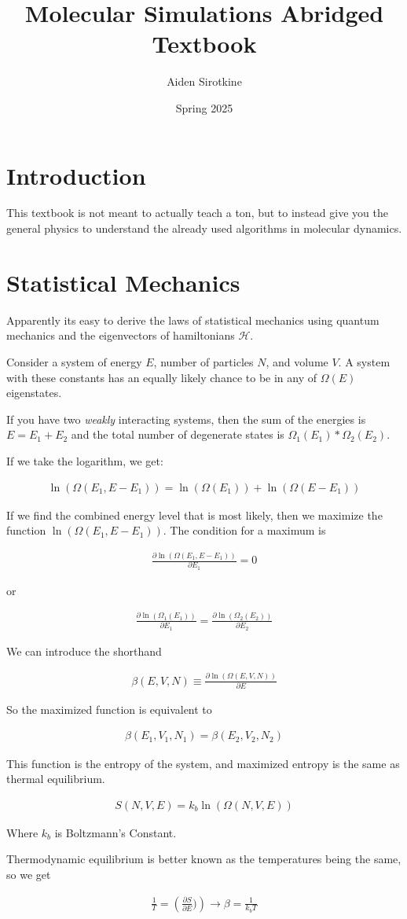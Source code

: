\documentclass[fleqn]{report}
\date{Spring 2025}
\title{Molecular Simulations Abridged Textbook}
\author{Aiden Sirotkine}
\newcommand{\del}{\partial}
\newcommand{\equations} [1] {
\begin{gather*}
#1
\end{gather*}
}
\begin{document}
\pagestyle{fancy}
\maketitle
\tableofcontents
\clearpage

\chapter{Introduction}
This textbook is not meant to actually teach a ton, but to instead 
give you the general physics to understand the already used algorithms 
in molecular dynamics. 


\chapter{Statistical Mechanics}
Apparently its easy to derive the laws of statistical mechanics using 
quantum mechanics and the eigenvectors of hamiltonians $\mathcal H$.

Consider a system of energy $E$, number of particles $N$, and volume $V$. 
A system with these constants has an equally likely chance to be in any 
of $\Omega(E)$ eigenstates. 

If you have two \textit{weakly} interacting systems, then the sum of the energies 
is $E = E_1 + E_2$ and the total number of degenerate states is 
$\Omega_1(E_1) * \Omega_2(E_2)$.

If we take the logarithm, we get:
\equations{
    \ln(\Omega(E_1, E - E_1)) 
    =
    \ln(\Omega(E_1))
    +
    \ln(\Omega(E - E_1))
}

If we find the combined energy level that is most likely, then we maximize 
the function $\ln(\Omega(E_1, E - E_1))$. The condition for a maximum is 
\equations{
    \frac{\del \ln(\Omega(E_1, E - E_1)) }{\del E_1}
    =
    0
}
or 
\equations{
    \frac{\del \ln(\Omega_1(E_1)) }{\del E_1}
    =
    \frac{\del \ln(\Omega_2(E_2)) }{\del E_2}
}
We can introduce the shorthand 
\equations{
    \beta(E, V, N)
    \equiv
    \frac{\del \ln(\Omega(E, V, N)) }{\del E}
}
So the maximized function is equivalent to 
\equations{
    \beta(E_1, V_1, N_1)
    =
    \beta(E_2, V_2, N_2)
}
This function is the entropy of the system, and maximized entropy is the same as 
thermal equilibrium. 
\equations{
    S(N, V, E) = k_b \ln(\Omega(N, V, E))
}
Where $k_b$ is Boltzmann's Constant. 

Thermodynamic equilibrium is better known as the temperatures being the same, 
so we get 
\equations{
    \frac{1}{T} 
    =
    \left(
        \frac{\del S}{\del E})
    \right)
    \rightarrow 
    \beta = \frac{1}{k_b T}
}
\end{document}
